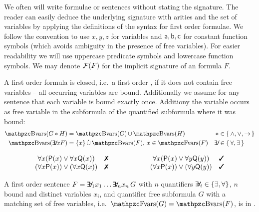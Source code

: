 We often will write formulae or sentences
without stating the signature.
The reader can easily deduce the underlying  signature with arities
and the set of variables by applying the definitions of the syntax for first order formulae.
We follow the convention to use \( x,y,z \) for variables
and \( \mathsf{a},\mathsf{b},\mathsf{c} \) for constant function symbols
(which avoids ambiguity in the presence of free variables).
For easier readability we will use uppercase predicate symbols and lowercase function symbols.
We may denote \( \mathcal{F}(F) \) for the implicit signature of an formula \( F \).

\begin{definition}\label{def:fof:closed}\label{def:fof:sentence}
	A first order formula is closed, i.e.~a first order ,
	if it does not contain free variables -- all occurring variables are bound.
	Additionally we assume for any sentence
	that each variable is bound exactly once.
	Additiony the variable occurs as free variable
	in the subformula of the quantified subformula
	where it was bound:
	\begin{align*}
	\bvar(G * H) &= \bvar(G)\disjointunion\bvar(H)
	 &*& \in\{\,\land,\lor,\limp\,\}
	\\
	\bvar(\quantify x F) &= \{x\}\disjointunion\bvar(F)\text{, } x\in\fvar(F)
	&\quantify& \in\{\, \forall, \exists\,\}
\end{align*}
\end{definition}

\begin{example}
	\[
	\begin{array}{clccl}
		\forall x ({\mP(x) \lor \forall x {\mQ(x)}}) &
		\text{\xmark}
		&\qquad\qquad
		&
		\forall x ({\mP(x) \lor \forall y {\mQ(y)}}) &
		\text{\cmark}
		\\
		(\forall x {\mP(x)}) \lor (\forall x {\mQ(x)}) &
		\text{\xmark}
		&&
		(\forall x {\mP(x)}) \lor (\forall y {\mQ(y)}) &
		\text{\cmark}
	\end{array}
	\]

\end{example}

\begin{definition}[\PNF]
	A first order sentence \( F = \quantify_1 x_1 \ldots \quantify_n x_n\, G \)
	with \( n \) quantifiers \( \quantify_i \in \{\exists,\forall\} \),
	\( n \) bound and distinct variables \( x_i \),
	and quantifier free subformula \( G \) with
	a matching set of free variables, i.e.~\( \fvar(G) = \bvar(F) \),
	is in .
\end{definition}


